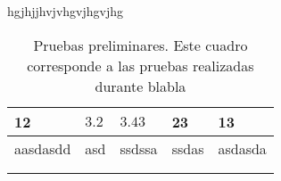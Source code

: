 hgjhjjhvjvhgvjhgvjhg
\begin{table}[h]
\begin{tabular}{|l|l|l|l|l|}
\hline
12       & $3.2$  & $3.43$    & 23    & 13      \\ \hline
aasdasdd & asd & ssdssa & ssdas & asdasda \\ \hline
         &     &        &       &         \\ \hline
         &     &        &       &         \\ \hline
\end{tabular}
\caption[Pruebas preliminares]{Pruebas preliminares. Este cuadro corresponde a las pruebas realizadas durante blabla} 
\label{cuadro:pritabla}
\end{table}
